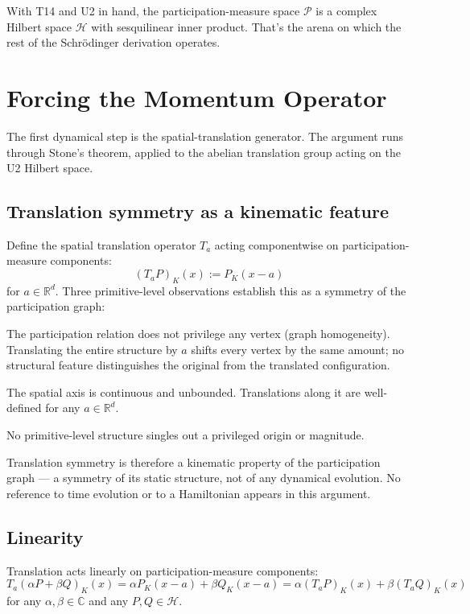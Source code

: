 \documentclass[11pt,a4paper]{article}
\begin{document}
With T14 and U2 in hand, the participation-measure space $\mathcal{P}$ is a complex Hilbert space $\mathcal{H}$ with sesquilinear inner product. That's the arena on which the rest of the Schr\"odinger derivation operates.

\section{Forcing the Momentum Operator}

The first dynamical step is the spatial-translation generator. The argument runs through Stone's theorem, applied to the abelian translation group acting on the U2 Hilbert space.

\subsection{Translation symmetry as a kinematic feature}

Define the spatial translation operator $T_a$ acting componentwise on participation-measure components:
\[
(T_a P)_K(x) := P_K(x - a)
\]
for $a \in \mathbb{R}^d$. Three primitive-level observations establish this as a symmetry of the participation graph:

The participation relation does not privilege any vertex (graph homogeneity). Translating the entire structure by $a$ shifts every vertex by the same amount; no structural feature distinguishes the original from the translated configuration.

The spatial axis is continuous and unbounded. Translations along it are well-defined for any $a \in \mathbb{R}^d$.

No primitive-level structure singles out a privileged origin or magnitude.

Translation symmetry is therefore a kinematic property of the participation graph --- a symmetry of its static structure, not of any dynamical evolution. No reference to time evolution or to a Hamiltonian appears in this argument.

\subsection{Linearity}

Translation acts linearly on participation-measure components:
\[
T_a(\alpha P + \beta Q)_K(x) = \alpha P_K(x - a) + \beta Q_K(x - a) = \alpha(T_a P)_K(x) + \beta(T_a Q)_K(x)
\]
for any $\alpha, \beta \in \mathbb{C}$ and any $P, Q \in \mathcal{H}$.
\end{document}

